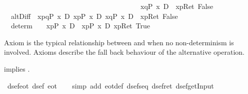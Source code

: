 \begin{isabellebody}
\ \ \ \ \ \ \ \ \ \ \ \ \ \ \ \ \ \ \ \ \ \ \ \ \ \ \ \ \ \ \ \ \ \ \ \ \ {\isacharparenleft}\ {\isacharbrackleft}{\isacharhash}\ x{\isasymleftarrow}q{\isacharbrackright}{\isacharparenleft}P\ x{\isacharparenright}\ {\isasymand}\isactrlsub D\ {\isacharbrackleft}{\isacharhash}\ x{\isasymleftarrow}p{\isacharbrackright}{\isacharparenleft}Ret\ False{\isacharparenright}\ {\isacharparenright}{\isachardoublequote}\isanewline
\ \ altD{\isacharunderscore}iff{\isacharcolon}\ {\isachardoublequote}{\isasymturnstile}\ {\isasymlangle}x{\isasymleftarrow}p{\isasymparallel}q{\isasymrangle}{\isacharparenleft}P\ x{\isacharparenright}\ {\isasymlongleftrightarrow}\isactrlsub D\ {\isasymlangle}x{\isasymleftarrow}p{\isasymrangle}{\isacharparenleft}P\ x{\isacharparenright}\ {\isasymor}\isactrlsub D\ {\isacharparenleft}{\isasymlangle}x{\isasymleftarrow}q{\isasymrangle}{\isacharparenleft}P\ x{\isacharparenright}\ {\isasymand}\isactrlsub D\ {\isacharbrackleft}{\isacharhash}\ x{\isasymleftarrow}p{\isacharbrackright}{\isacharparenleft}Ret\ False{\isacharparenright}{\isacharparenright}{\isachardoublequote}\isanewline
\ \ determ{\isacharcolon}\ \ \ {\isachardoublequote}{\isasymturnstile}\ {\isasymlangle}x{\isasymleftarrow}p{\isasymrangle}{\isacharparenleft}P\ x{\isacharparenright}\ {\isasymlongleftrightarrow}\isactrlsub D\ {\isacharbrackleft}{\isacharhash}\ x{\isasymleftarrow}p{\isacharbrackright}{\isacharparenleft}P\ x{\isacharparenright}\ {\isasymand}\isactrlsub D\ {\isasymlangle}x{\isasymleftarrow}p{\isasymrangle}{\isacharparenleft}Ret\ True{\isacharparenright}{\isachardoublequote}\isamarkupfalse%
%
\begin{isamarkuptext}%
Axiom  is the typical relationship between  and  
  when no non-determinism is involved. Axioms  describe the 
  fall back behaviour of the alternative operation.%
\end{isamarkuptext}%
\isamarkuptrue%
%
\begin{isamarkuptext}%
 implies .%
\end{isamarkuptext}%
\isamarkuptrue%
\ dsef{\isacharunderscore}eot{\isacharcolon}\ {\isachardoublequote}dsef\ eot{\isachardoublequote}\isanewline
\ \ \isamarkupfalse%
\ {\isacharparenleft}simp\ add{\isacharcolon}\ eot{\isacharunderscore}def\ dsef{\isacharunderscore}seq\ dsef{\isacharunderscore}ret\ dsef{\isacharunderscore}getInput{\isacharparenright}\isamarkupfalse%

\end{isabellebody}
